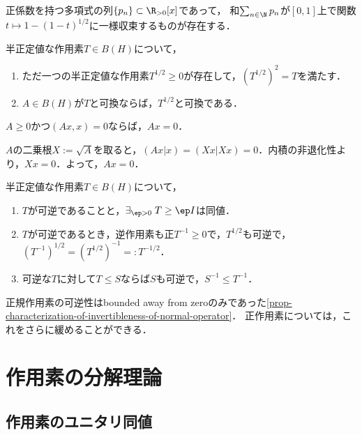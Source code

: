 \documentclass[uplatex,dvipdfmx]{jsreport}
\begin{document}
\begin{lemma}
    正係数を持つ多項式の列$\{p_n\}\subset\R_{>0}[x]$であって，
    和$\sum_{n\in\N}p_n$が$[0,1]$上で関数$t\mapsto 1-(1-t)^{1/2}$に一様収束するものが存在する．
\end{lemma}

\begin{proposition}\label{prop-square-root-lemma}
    半正定値な作用素$T\in B(H)$について，
    \begin{enumerate}
        \item ただ一つの半正定値な作用素$T^{1/2}\ge0$が存在して，$(T^{1/2})^2=T$を満たす．
        \item $A\in B(H)$が$T$と可換ならば，$T^{1/2}$と可換である．
    \end{enumerate}
\end{proposition}

\begin{corollary}
    $A\ge 0$かつ$(Ax,x)=0$ならば，$Ax=0$．
\end{corollary}
\begin{Proof}
    $A$の二乗根$X:=\sqrt{A}$を取ると，$(Ax|x)=(Xx|Xx)=0$．内積の非退化性より，$Xx=0$．よって，$Ax=0$．
\end{Proof}

\begin{proposition}[正作用素の可逆性]
    半正定値な作用素$T\in B(H)$について，
    \begin{enumerate}
        \item $T$が可逆であることと，$\exists_{\ep>0}\;T\ge\ep I$は同値．
        \item $T$が可逆であるとき，逆作用素も正$T^{-1}\ge 0$で，$T^{1/2}$も可逆で，$(T^{-1})^{1/2}=(T^{1/2})^{-1}=:T^{-1/2}$．
        \item 可逆な$T$に対して$T\le S$ならば$S$も可逆で，$S^{-1}\le T^{-1}$．
    \end{enumerate}
\end{proposition}
\begin{remarks}
    正規作用素の可逆性はbounded away from zeroのみであった\ref{prop-characterization-of-invertibleness-of-normal-operator}．
    正作用素については，これをさらに緩めることができる．
\end{remarks}

\section{作用素の分解理論}

\subsection{作用素のユニタリ同値}
\end{document}
